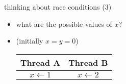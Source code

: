 \begin{frame}{thinking about race conditions (3)}
\begin{itemize}
\item what are the possible values of $x$? \\
\item (initially $x = y = 0$) \\
\begin{tabular}{cc}
    \bfseries{Thread A} & \bfseries{Thread B} \\ \hline
    $x \leftarrow 1$ & $x \leftarrow 2$ \\
\end{tabular}
\iftoggle{heldback}{}{
\item<2-> 1 or 2
\item<3-> \ldots but why not 3?
    \begin{itemize}
    \item B: x bit 0 $\leftarrow 0$
    \item A: x bit 0 $\leftarrow 1$
    \item A: x bit 1 $\leftarrow 0$
    \item B: x bit 1 $\leftarrow 1$
    \end{itemize}
}
\end{itemize}
\end{frame}

